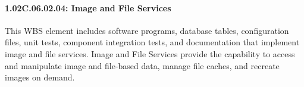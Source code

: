 \paragraph{1.02C.06.02.04: Image and File Services}

This WBS element includes software programs, database tables, configuration files, unit tests, component integration tests, and documentation that implement image and file services. Image and File Services provide the capability to access and manipulate image and file-based data, manage file caches, and recreate images on demand.
